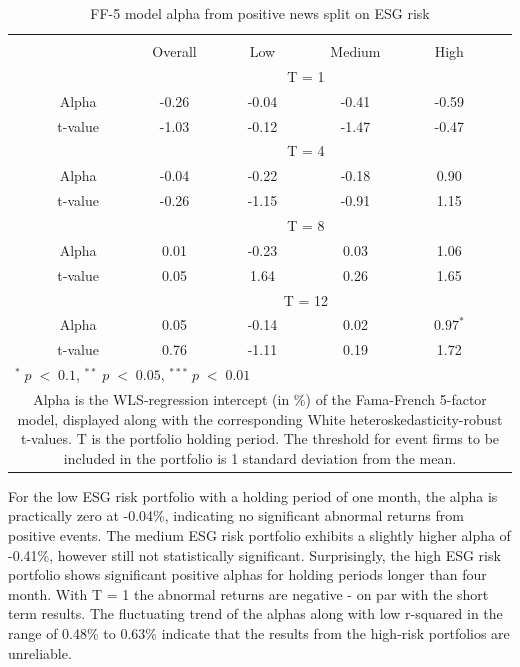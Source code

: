 \setlength{\tabcolsep}{15pt}
\begin{table}[h]
\small
\centering
\caption{FF-5 model alpha from positive news split on ESG risk} 
\begin{tabular}{ccccccc}
\hline \hline \\  
 &     & Overall  &    Low  &  Medium  &  High  &  \\ \cline{3-6} 
& & \multicolumn{4}{c}{ T = 1} & \\ \cline{2-6}
& Alpha   & -0.26 & -0.04  & -0.41  & -0.59 &  \\
& t-value & -1.03 & -0.12 & -1.47  & -0.47 & \\
& &  \multicolumn{4}{c}{ T = 4} & \\ \cline{2-6}
& Alpha   & -0.04 & -0.22  & -0.18  &  0.90 & \\
& t-value & -0.26 & -1.15 & -0.91  & 1.15 & \\
& &  \multicolumn{4}{c}{ T = 8} & \\ \cline{2-6}
& Alpha   & 0.01 & -0.23   & 0.03  & 1.06 &  \\
& t-value & 0.05 & 1.64  & 0.26 & 1.65 & \\
&  &  \multicolumn{4}{c}{ T = 12} & \\ \cline{2-6}
& Alpha   & 0.05 & -0.14  & 0.02  & $0.97^{*}$ &  \\
& t-value & 0.76 & -1.11  & 0.19 & 1.72 & \\
\hline \hline
 \multicolumn{7}{l}{ \footnotesize $^* \; p\; <\; 0.1$, $ ^{**} \; p\; <\; 0.05$, $ ^{***} \; p\; <\; 0.01$  } \\
 \multicolumn{7}{p{12cm}}{ \footnotesize Alpha is the WLS-regression intercept (in \%) of the Fama-French 5-factor model, displayed along with the corresponding White heteroskedasticity-robust t-values. T is the portfolio holding period. The threshold for event firms to be included in the portfolio is 1 standard deviation from the mean.}  \\ 
\end{tabular}
\label{tab: FF5_pos_ESG}
\end{table}

For the low ESG risk portfolio with a holding period of one month, the alpha is practically zero at -0.04\%, indicating no significant abnormal returns from positive events. The medium ESG risk portfolio exhibits a slightly higher alpha of -0.41\%, however still not statistically significant. Surprisingly, the high ESG risk portfolio shows significant positive alphas for holding periods longer than four month. With T = 1 the abnormal returns are negative - on par with the short term results. The fluctuating trend of the alphas along with low r-squared in the range of 0.48\% to 0.63\% indicate that the results from the high-risk portfolios are unreliable. 

